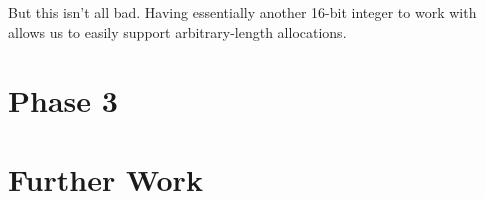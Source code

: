 \documentclass{article}
\begin{document}
But this isn't all bad. Having essentially another 16-bit integer to work with
allows us to easily support arbitrary-length allocations.


\section{Phase 3}
\section{Further Work}
\end{document}
